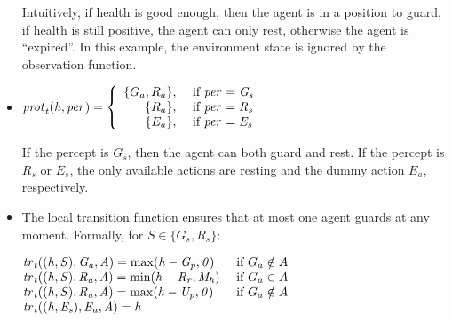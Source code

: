 \begin{example}
\begin{itemize}[$\bullet$]
    Intuitively, if health is good enough, then the agent is in a position to
    guard, if health is still positive, the agent can only rest, otherwise the
    agent is ``expired''. In this example, the environment state is ignored by
    the observation function.
    
  \item $\it{prot}_{t}(h,\it{per}_{}) = \left\{
      \begin{array}{rl}
        \{G_a, R_a\}, & \text{ if } \it{per}_{} = G_s\\ 
        \{R_a\}, & \text{ if } \it{per}_{} = R_s\\ 
        \{E_a\}, & \text{ if } \it{per}_{} = E_s\\
      \end{array} \right.$

    If the percept is $G_s$, then the agent can both guard and rest. If the
    percept is $R_s$ or $E_s$, the only available actions are resting and the
    dummy action $E_a$, respectively.
    
  \item The local transition function ensures that at most one agent guards at
    any moment. Formally, for $S \in \{G_s,R_s\}$:

    $\begin{array}{@{}l@{\quad}l}\small
       \tr{t}((h,S), G_a, A) = \max(h - G_p,0) &\text{ if }G_a\notin A\\%
       \tr{t}((h,S), R_a, A) = \min(h + R_r, M_h) &\text{ if }G_a\in A\\
       \tr{t}((h,S), R_a, A) = \max(h - U_p,0) &\text{ if }G_a\notin A\\%
       
       \tr{t}((h,E_s), E_a, A) = h\\
     \end{array}$
  \end{itemize}

\end{example}

